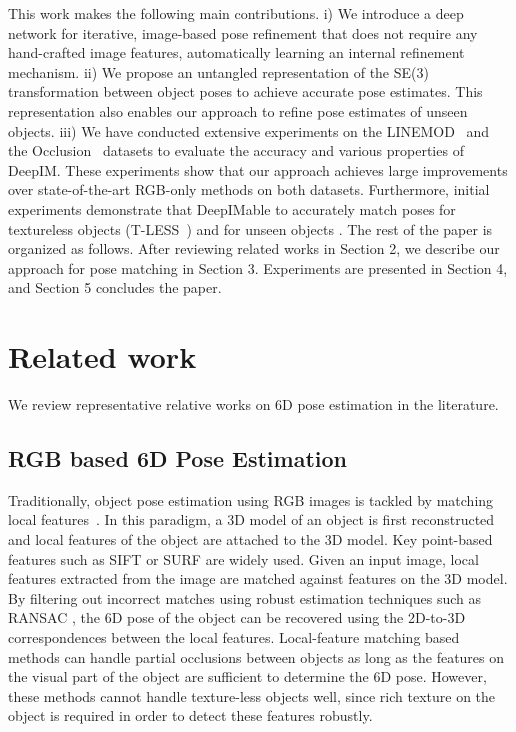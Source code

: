 \documentclass[twocolumn]{svjour3}
\newcommand{\dimnet}[0]{DeepIM}
\begin{document}
This work makes the following main contributions. i) We introduce a deep network for iterative, image-based pose refinement that does not require any hand-crafted image features, automatically learning an internal refinement mechanism. ii) We propose an untangled representation of the SE(3) transformation between object poses to achieve accurate pose estimates. This representation also enables our approach to refine pose estimates of unseen objects. 
iii) We have conducted extensive experiments on the LINEMOD~\citep{hinterstoisser2012accv} and the Occlusion~\citep{Brachmann2014Learning6O} datasets to evaluate the accuracy and various properties of \dimnet. These experiments show that our approach achieves large improvements over state-of-the-art RGB-only methods on both datasets. Furthermore, initial experiments demonstrate that \dimnet\is able to accurately match poses for textureless objects (T-LESS~\citep{hodan2017t}) and for unseen objects \citep{wu20153d}. The rest of the paper is organized as follows. After reviewing related works in Section 2, we describe our approach for pose matching in Section 3. Experiments are presented in Section 4, and Section 5 concludes the paper.

\section{Related work}

We review representative relative works on 6D pose estimation in the literature.

\subsection{RGB based 6D Pose Estimation}

Traditionally, object pose estimation using RGB images is tackled by matching local features~\citep{lowe1999object,rothganger20063d,collet2011moped}. In this paradigm, a 3D model of an object is first reconstructed and local features of the object are attached to the 3D model. Key point-based features such as SIFT \citep{lowe1999object} or SURF \citep{bay2008speeded} are widely used. Given an input image, local features extracted from the image are matched against features on the 3D model. By filtering out incorrect matches using robust estimation techniques such as RANSAC \citep{nister2005preemptive}, the 6D pose of the object can be recovered using the 2D-to-3D correspondences between the local features. Local-feature matching based methods can handle partial occlusions between objects as long as the features on the visual part of the object are sufficient to determine the 6D pose. However, these methods cannot handle texture-less objects well, since rich texture on the object is required in order to detect these features robustly.
\end{document}
